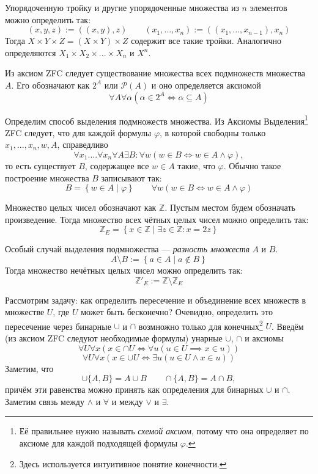 Упорядоченную тройку и другие упорядоченные множества из $n$ элементов
можно определить так:
\[
  (x,y,z):=((x,y),z)\qquad (x_1,...,x_{n}):=((x_1,...,x_{n-1}),x_{n})
\]
Тогда $X\times Y\times Z=(X\times Y)\times Z$ содержит все такие тройки.
Аналогично определяются $X_1\times X_2\times ...\times X_{n}$ и $X^{n}$.

Из аксиом ZFC следует существование множества всех подмножеств множества $A$.
Его обозначают как $2^{A}$ или $\mathcal P(A)$ и оно определяется аксиомой
\[
  \forall A\forall \alpha(\alpha\in 2^{A}\iff \alpha\subseteq A)
\]

Определим способ выделения подмножеств множества.
Из Аксиомы Выделения\footnote{Её правильнее нужно называть
{\it схемой аксиом},
потому что она определяет по аксиоме для каждой подходящей
формулы $\varphi$.}
ZFC следует, что для каждой формулы $\varphi$, в которой свободны
только $x_1,...,x_{n},w,A$, справедливо
\[
  \forall x_1....\forall x_{n}\forall A\exists B:\forall w(w\in B\iff
  w\in A\land \varphi),
\]
то есть существует $B$, содержащее все $w\in A$ такие, что $\varphi$.
Обычно такое построение множества $B$ записывают так:
\[
  B=\left\{w\in A\;\big|\;\varphi\right\}\qquad
  \forall w(w\in B\iff w\in A\land \varphi)
\]

\newcommand\Z{\mathbb Z}
Множество целых чисел обозначают как $\Z$\index{множество!целых чисел, $\Z$}.
Пустым местом будем обозначать произведение. Тогда
множество всех чётных целых чисел можно определить так:
\[
  \Z_{E}=\left\{x\in\Z\;\big|\;\exists z\in\Z:x=2z\right\}
\]

Особый случай выделения подмножества --- {\it разность множеств} $A$ и $B$.
\[
  A\setminus B:=\left\{a\in A\;\big|\; a\notin B\right\}
\]
Тогда множество нечётных целых чисел можно определить так:
\[
  \Z'_{E}:=\Z\setminus \Z_E
\]

Рассмотрим задачу: как определить пересечение и объединение
всех множеств в множестве $U$, где $U$ может быть бесконечно?
Очевидно, определить это пересечение через бинарные $\cup$ и $\cap$
возмножно только для конечных\footnote{Здесь используется
  интуитивное понятие конечности.} $U$.
Введём (из аксиом ZFC следуют необходимые формулы) унарные $\cup$, $\cap$
и аксиомы
\[
  \forall U\forall x(x\in \cap U\iff \forall u(u\in U\implies x\in u))
\]
\[
  \forall U\forall x(x\in \cup U\iff \exists u(u\in U\land x\in u))
\]
Заметим, что
\[
  \cup \{A,B\}=A\cup B\qquad \cap \{A,B\}=A\cap B,
\]
причём эти равенства можно принять как определения для бинарных $\cup$ и $\cap$.
Заметим связь между $\land$ и $\forall$ и между $\lor$ и $\exists$.

